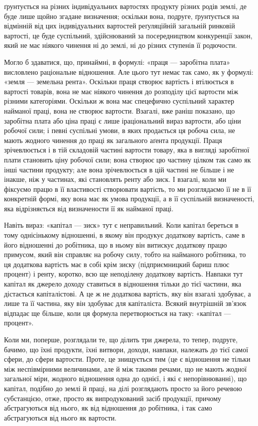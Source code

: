 ґрунтується на різних індивідуальних вартостях продукту різних родів землі,
де буде лише щойно згадане визначення; оскільки вона, подруге, ґрунтується на
відмінній від цих індивідуальних вартостей реґуляційній загальній ринковій
вартості, це буде суспільний, здійснюваний за посередництвом конкуренції закон,
який не має ніякого чинення ні до землі, ні до різних ступенів її родючости.

Могло б здаватися, що, принаймні, в формулі: «праця — заробітна плата»
висловлено раціональне відношення. Але цього тут немає так само, як у формулі:
«земля — земельна рента». Оскільки праця створює вартість і втілюється
в вартості товарів, вона не має ніякого чинення до розподілу цієї вартости між
різними категоріями. Оскільки ж вона має спецефично суспільний характер
найманої праці, вона не створює вартости. Взагалі, вже раніш показано, що
заробітна плата або ціна праці є лише іраціональний вираз вартости, або ціни
робочої сили; і певні суспільні умови, в яких продається ця робоча сила, не
мають жодного чинення до праці як загального аґента продукції. Праця зрічевлюється
і в тій складовій частині вартости товару, яка в вигляді заробітної
плати становить ціну робочої сили; вона створює цю частину цілком так само
як інші частини продукту; але вона зрічевлюється в цій частині не більше і
не інакше, ніж у частинах, які становлять ренту або зиск. І взагалі, коли ми
фіксуємо працю в її властивості створювати вартість, то ми розглядаємо її не
в її конкретній формі, яку вона має як умова продукції, а в її суспільній
визначеності, яка відрізняється від визначености її як найманої праці.

Навіть вираз: «капітал — зиск» тут є неправильний. Коли капітал береться
в тому однісінькому відношенні, в якому він продукує додаткову вартість,
саме в його відношенні до робітника, що в ньому він витискує додаткову працю
примусом, який він справляє на робочу силу, тобто на найманого робітника,
то ця додаткова вартість має в собі крім зиску (підприємницкий бариш плюс
процент) і ренту, коротко, всю ще неподілену додаткову вартість. Навпаки тут
капітал як джерело доходу ставиться в відношення тільки до тієї частини, яка
дістається капіталістові. А це ж не додаткова вартість, яку він взагалі здобуває,
а лише та її частина, яку він здобуває для капіталіста. Всякий внутрішній
зв’язок відпадає ще більше, коли ця формула перетворюється на таку: «капітал
— процент».

Коли ми, поперше, розглядали те, що ділить три джерела, то тепер, подруге,
бачимо, що їхні продукти, їхні витвори, доходи, навпаки, належать до тієї
самої сфери, до сфери вартости. Проте, це знищується тим (це є відношення
не тільки між неспівмірними величинами, але й між такими речами, що не
мають жодної загальної міри, жодного відношення одна до однієї, і які є непорівнюванні),
що капітал, подібно до землі й праці, на ділі розглядають просто за
його речевою субстанцією, отже, просто як випродукований засіб продукції,
причому абстрагуються від нього, як від відношення до робітника, і так само
абстрагуються від нього як вартости.


